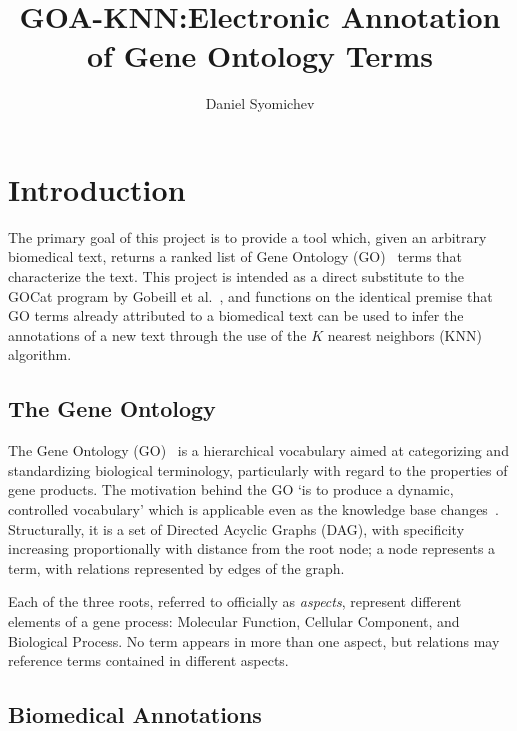 \documentclass[11pt]{article}
\title{GOA-KNN:\@ Electronic Annotation of Gene Ontology Terms}
\author{Daniel Syomichev}
\theoremstyle{plain}
\theoremstyle{definition}
\begin{document}
\maketitle

\declaration{}

\begin{abstract}
\end{abstract}

\section{Introduction}\label{sec:introduction}

The primary goal of this project is to provide a tool which, given an arbitrary biomedical text, returns a ranked list of Gene Ontology (GO)~\cite{ashburner/2000/gene,consortium/2025/gene} terms that characterize the text. This project is intended as a direct substitute to the GOCat program by Gobeill et al.\ \cite{gobeill/2013/managing}, and functions on the identical premise that GO terms already attributed to a biomedical text can be used to infer the annotations of a new text through the use of the $K$ nearest neighbors (KNN) algorithm.

\subsection{The Gene Ontology}\label{sec:introduction-ontology}

The Gene Ontology (GO)~\cite{consortium/2025/gene} is a hierarchical vocabulary aimed at categorizing and standardizing biological terminology, particularly with regard to the properties of gene products. The motivation behind the GO `is to produce a dynamic, controlled vocabulary' which is applicable even as the knowledge base changes~\cite{ashburner/2000/gene}. Structurally, it is a set of Directed Acyclic Graphs (DAG), with specificity increasing proportionally with distance from the root node; a node represents a term, with relations represented by edges of the graph.

Each of the three roots, referred to officially as \textit{aspects}, represent different elements of a gene process: Molecular Function, Cellular Component, and Biological Process. No term appears in more than one aspect, but relations may reference terms contained in different aspects.

\subsection{Biomedical Annotations}\label{sec:introduction-annotations}
\end{document}
